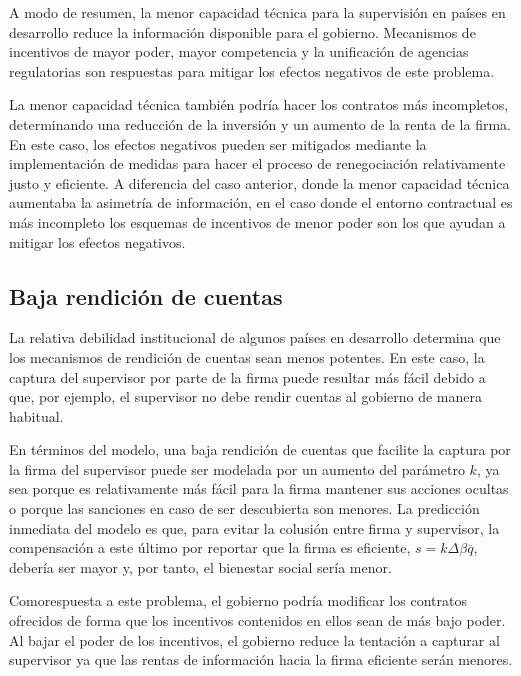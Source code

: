 \documentclass[
  12pt,
  spanish,
]{book}
\begin{document}
A modo de resumen, la menor capacidad técnica para la supervisión en países en desarrollo reduce la información disponible para el gobierno. Mecanismos de incentivos de mayor poder, mayor competencia y la unificación de agencias regulatorias son respuestas para mitigar los efectos negativos de este problema.

La menor capacidad técnica también podría hacer los contratos más incompletos, determinando una reducción de la inversión y un aumento de la renta de la firma. En este caso, los efectos negativos pueden ser mitigados mediante la implementación de medidas para hacer el proceso de renegociación relativamente justo y eficiente. A diferencia del caso anterior, donde la menor capacidad técnica aumentaba la asimetría de información, en el caso donde el entorno contractual es más incompleto los esquemas de incentivos de menor poder son los que ayudan a mitigar los efectos negativos.

\hypertarget{rendicion}{%
\subsection{Baja rendición de cuentas}\label{rendicion}}

La relativa debilidad institucional de algunos países en desarrollo determina que los mecanismos de rendición de cuentas sean menos potentes. En este caso, la captura del supervisor por parte de la firma puede resultar más fácil debido a que, por ejemplo, el supervisor no debe rendir cuentas al gobierno de manera habitual.

En términos del modelo, una baja rendición de cuentas que facilite la captura por la firma del supervisor puede ser modelada por un aumento del parámetro \(k\), ya sea porque es relativamente más fácil para la firma mantener sus acciones ocultas o porque las sanciones en caso de ser descubierta son menores. La predicción inmediata del modelo es que, para evitar la colusión entre firma y supervisor, la compensación a este último por reportar que la firma es eficiente, \(s = kΔβ \overline q\), debería ser mayor y, por tanto, el bienestar social sería menor.

Comorespuesta a este problema, el gobierno podría modificar los contratos ofrecidos de forma que los incentivos contenidos en ellos sean de más bajo poder. Al bajar el poder de los incentivos, el gobierno reduce la tentación a capturar al supervisor ya que las rentas de información hacia la firma eficiente serán menores.
\end{document}
